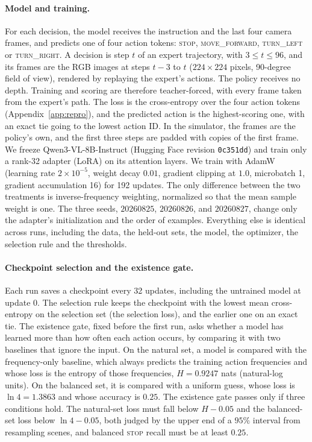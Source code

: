 \paragraph{Model and training.}
For each decision, the model receives the instruction and the last four camera frames, and predicts
one of four action tokens: \textsc{stop}, \textsc{move\_forward}, \textsc{turn\_left} or
\textsc{turn\_right}. A decision is
step $t$ of an expert trajectory, with $3\le t\le 96$, and its frames are the RGB images at steps
$t-3$ to $t$ ($224\times224$ pixels, 90-degree field of view), rendered by replaying the expert's
actions. The policy receives no depth. Training and scoring are therefore teacher-forced, with
every frame taken from the expert's path. The loss is the cross-entropy over the four
action tokens (Appendix~\ref{app:repro}), and the predicted action is the highest-scoring one, with
an exact tie going to the lowest action ID. In the simulator, the frames are the policy's own, and
the first three steps are padded with copies of the first frame. We freeze Qwen3-VL-8B-Instruct
\citep{bai2025qwen3vl} (Hugging Face revision \texttt{0c351dd}) and train only a rank-32 adapter
(LoRA) \citep{hu2022lora} on its attention layers. We train with AdamW (learning rate
$2\times10^{-5}$, weight decay $0.01$, gradient clipping at $1.0$, microbatch 1, gradient
accumulation 16) for 192 updates. The only difference between the two treatments is
inverse-frequency weighting, normalized so that the mean sample weight is one. The three seeds,
$20260825$, $20260826$, and $20260827$, change only the adapter's initialization and the order of
examples. Everything else is identical across runs, including the data, the held-out sets, the
model, the optimizer, the selection rule and the thresholds.

\paragraph{Checkpoint selection and the existence gate.}
Each run saves a checkpoint every 32 updates, including the untrained model at update 0. The
selection rule keeps the checkpoint with the lowest mean cross-entropy on the selection set (the
selection loss), and the earlier one on an exact tie. The existence gate, fixed before the first run, asks whether a
model has learned more than how often each action occurs, by comparing it with two baselines that
ignore the input. On the natural set, a model is compared with the frequency-only baseline, which
always predicts the training action frequencies and whose loss is the entropy of those frequencies,
$H=0.9247$ nats (natural-log units). On the balanced set, it is compared with a uniform guess, whose
loss is $\ln 4=1.3863$ and whose accuracy is $0.25$. The existence gate passes only if three conditions
hold. The natural-set loss must fall below $H-0.05$ and the balanced-set loss below $\ln 4-0.05$,
both judged by the upper end of a $95\%$ interval from resampling scenes, and balanced
\textsc{stop} recall must be at least $0.25$.

